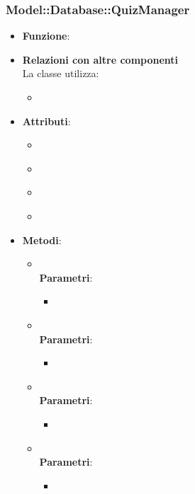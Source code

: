 \subsubsection{Model::Database::QuizManager}
\begin{itemize}
\item\textbf{Funzione}:
\item\textbf{Relazioni con altre componenti}\\
La classe utilizza:
	\begin{itemize}
		\item
	\end{itemize}
\item\textbf{Attributi}:
	\begin{itemize}
		\item\code{}\\
		\item\code{}\\
		\item\code{}\\
		\item\code{}\\
	\end{itemize}
\item\textbf{Metodi}:
	\begin{itemize}
		\item\code{}\\
		\textbf{Parametri}:
			\begin{itemize}
				\item\code{}\\
			\end{itemize}
		\item\code{}\\
		\textbf{Parametri}:
			\begin{itemize}
				\item\code{}\\
			\end{itemize}
		\item\code{}\\
		\textbf{Parametri}:
			\begin{itemize}
				\item\code{}\\
			\end{itemize}
		\item\code{}\\
		\textbf{Parametri}:
			\begin{itemize}
				\item\code{}\\
			\end{itemize}
	\end{itemize}
\end{itemize}

